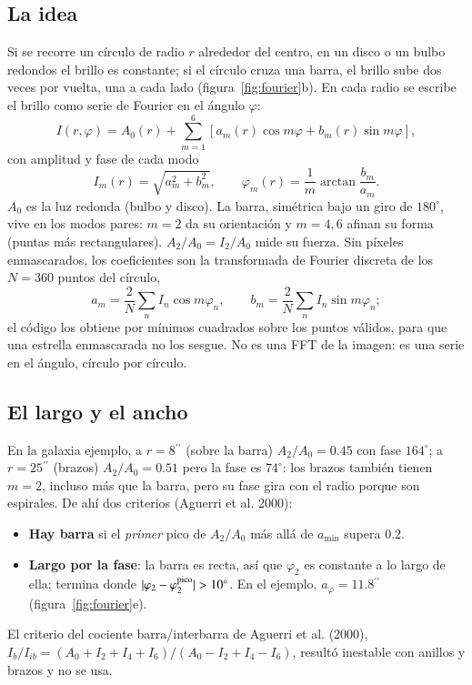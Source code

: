 \documentclass[11pt,a4paper]{article}
\newcommand{\as}{\ensuremath{^{\prime\prime}}}
\begin{document}
\subsection{La idea}

Si se recorre un círculo de radio $r$ alrededor del centro, en un disco o un bulbo redondos el brillo es
constante; si el círculo cruza una barra, el brillo sube dos veces por vuelta, una a cada lado
(figura~\ref{fig:fourier}b). En cada radio se escribe el brillo como serie de Fourier en el ángulo $\varphi$:
\begin{equation}\label{eq:fourier}
I(r,\varphi) = A_0(r) + \sum_{m=1}^{6}\left[a_m(r)\cos m\varphi + b_m(r)\sin m\varphi\right],
\end{equation}
con amplitud y fase de cada modo
\begin{equation}\label{eq:amfase}
I_m(r) = \sqrt{a_m^2 + b_m^2},\qquad \varphi_m(r) = \frac{1}{m}\arctan\frac{b_m}{a_m}.
\end{equation}
$A_0$ es la luz redonda (bulbo y disco). La barra, simétrica bajo un giro de $180^\circ$, vive en los modos pares:
$m = 2$ da su orientación y $m = 4, 6$ afinan su forma (puntas más rectangulares). $A_2/A_0 = I_2/A_0$ mide su
fuerza. Sin píxeles enmascarados, los coeficientes son la transformada de Fourier discreta de los $N = 360$
puntos del círculo,
\begin{equation}
a_m = \frac{2}{N}\sum_{n} I_n\cos m\varphi_n,\qquad b_m = \frac{2}{N}\sum_{n} I_n\sin m\varphi_n ;
\end{equation}
el código los obtiene por mínimos cuadrados sobre los puntos válidos, para que una estrella enmascarada no los
sesgue. No es una FFT de la imagen: es una serie en el ángulo, círculo por círculo.

\subsection{El largo y el ancho}

En la galaxia ejemplo, a $r = 8\as$ (sobre la barra) $A_2/A_0 = 0.45$ con fase $164^\circ$; a $r = 25\as$
(brazos) $A_2/A_0 = 0.51$ pero la fase es $74^\circ$: los brazos también tienen $m = 2$, incluso más que la
barra, pero su fase gira con el radio porque son espirales. De ahí dos criterios (Aguerri et al. 2000):
\begin{itemize}
\item \textbf{Hay barra} si el \emph{primer} pico de $A_2/A_0$ más allá de $a_{\min}$ supera 0.2.
\item \textbf{Largo por la fase}: la barra es recta, así que $\varphi_2$ es constante a lo largo de ella; termina
donde $|\varphi_2 - \varphi_2^{\rm pico}| > 10^\circ$. En el ejemplo, $a_{\varphi} = 11.8\as$
(figura~\ref{fig:fourier}e).
\end{itemize}
El criterio del cociente barra/interbarra de Aguerri et al. (2000),
$I_b/I_{ib} = (A_0 + I_2 + I_4 + I_6)/(A_0 - I_2 + I_4 - I_6)$, resultó inestable con anillos y brazos y no se usa.
\end{document}
